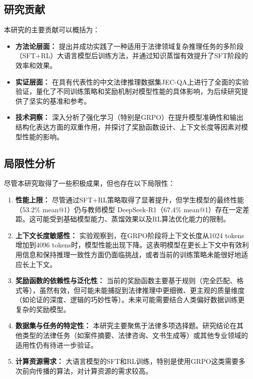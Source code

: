 \documentclass{article}
\newcommand{\deepseekr}{DeepSeek-R1}
\newcommand{\deepseekr}{DeepSeek-R1}
\begin{document}
\subsection{研究贡献}
本研究的主要贡献可以概括为：
\begin{itemize}
    \item \textbf{方法论层面：} 提出并成功实践了一种适用于法律领域复杂推理任务的多阶段（SFT+RL）大语言模型后训练方法，并通过知识蒸馏有效提升了SFT阶段的效率和效果。
    \item \textbf{实证层面：} 在具有代表性的中文法律推理数据集JEC-QA上进行了全面的实验验证，量化了不同训练策略和奖励机制对模型性能的具体影响，为后续研究提供了坚实的基准和参考。
    \item \textbf{技术洞察：} 深入分析了强化学习（特别是GRPO）在提升模型准确性和输出结构化表达方面的双重作用，并探讨了奖励函数设计、上下文长度等因素对模型性能的影响。
\end{itemize}

\subsection{局限性分析}
尽管本研究取得了一些积极成果，但也存在以下局限性：
\begin{enumerate}
    \item \textbf{性能上限：} 尽管通过SFT+RL策略取得了显著提升，但学生模型的最终性能（53.2\% mean@1）仍与教师模型 \deepseekr （67.4\% mean@1）存在一定差距。这可能受到基础模型能力、蒸馏效果以及RL算法优化能力的限制。
    \item \textbf{上下文长度敏感性：} 实验观察到，在GRPO阶段将上下文长度从1024 tokens增加到4096 tokens时，模型性能出现下降。这表明模型在更长上下文中有效利用信息和保持推理一致性方面仍面临挑战，或者当前的训练策略未能很好地适应长上下文。
    \item \textbf{奖励函数的依赖性与泛化性：} 当前的奖励函数主要基于规则（完全匹配、格式等），虽然有效，但可能未能捕捉到法律推理中更细微、更主观的质量维度（如论证的深度、逻辑的巧妙性等）。未来可能需要结合人类偏好数据训练更复杂的奖励模型。
    \item \textbf{数据集与任务的特定性：} 本研究主要聚焦于法律多项选择题。研究结论在其他类型的法律任务（如案件摘要、法律咨询、文书生成等）或其他专业领域的适用性仍有待进一步验证。
    \item \textbf{计算资源需求：} 大语言模型的SFT和RL训练，特别是使用GRPO这类需要多次前向传播的算法，对计算资源的需求较高。
\end{enumerate}
\end{document}
